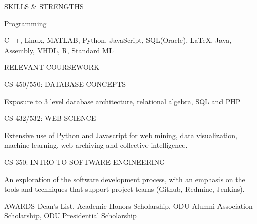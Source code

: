 \documentclass{resume} %
\begin{document}

\begin{rSection}{SKILLS \& STRENGTHS}
\begin{rSubsection}{Programming}{}{}{}
	\item[] C++, Linux, MATLAB, Python, JavaScript,  SQL(Oracle),  LaTeX, Java, Assembly, VHDL, R, Standard ML
\end{rSubsection}
\end{rSection}


\vspace{-5 pt}

\begin{rSection}{RELEVANT COURSEWORK}
\begin{rSubsection}{CS 450/550: DATABASE CONCEPTS}{}{}{}
	\item[] Exposure to 3 level database architecture, relational algebra, SQL and PHP
\end{rSubsection}

\begin{rSubsection}{CS 432/532: WEB SCIENCE}{}{}{}
	\item[] Extensive use of Python and Javascript for web mining, data visualization, machine learning, web archiving and collective intelligence.
\end{rSubsection}

\begin{rSubsection}{CS 350: INTRO TO SOFTWARE ENGINEERING}{}{}{}
	\item[]An exploration of the software development process, with an emphasis on the tools and techniques that support project teams (Github, Redmine, Jenkins).
\end{rSubsection}

\end{rSection}



\vspace{-5 pt}

\begin{rSection}{AWARDS}
	Dean's List, Academic Honors Scholarship, ODU Alumni Association Scholarship, ODU Presidential Scholarship

\end{rSection}



\end{document}
